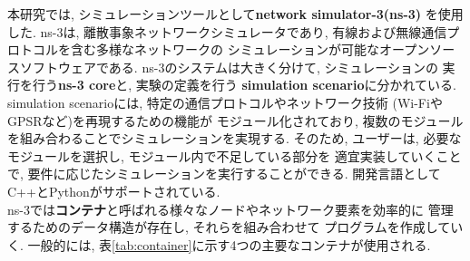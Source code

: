本研究では, シミュレーションツールとして\textbf{network simulator-3(ns-3)}
\cite{ns-3}を使用した. ns-3は, 離散事象ネットワークシミュレータであり, 
有線および無線通信プロトコルを含む多様なネットワークの
シミュレーションが可能なオープンソースソフトウェアである. 
ns-3のシステムは大きく分けて, シミュレーションの
実行を行う\textbf{ns-3 core}と, 実験の定義を行う
\textbf{simulation scenario}に分かれている. simulation scenarioには, 
特定の通信プロトコルやネットワーク技術 (Wi-FiやGPSRなど)を再現するための機能が
モジュール化されており, 複数のモジュールを組み合わることでシミュレーションを実現する. 
そのため, ユーザーは, 必要なモジュールを選択し, モジュール内で不足している部分を
適宜実装していくことで, 要件に応じたシミュレーションを実行することができる. 
開発言語としてC++とPythonがサポートされている. \\
\indent ns-3では\textbf{コンテナ}と呼ばれる様々なノードやネットワーク要素を効率的に
管理するためのデータ構造が存在し, それらを組み合わせて
プログラムを作成していく. 一般的には, 表\ref{tab:container}に示す4つの主要なコンテナが使用される.
